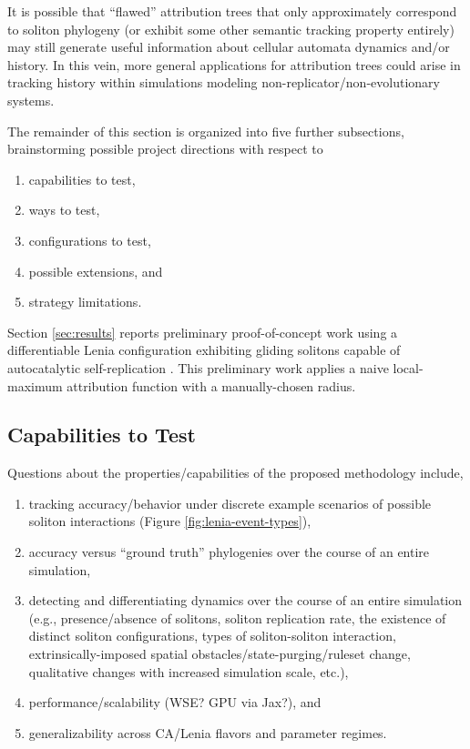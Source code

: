 It is possible that ``flawed'' attribution trees that only approximately correspond to soliton phylogeny (or exhibit some other semantic tracking property entirely) may still generate useful information about cellular automata dynamics and/or history.
In this vein, more general applications for attribution trees could arise in tracking history within simulations modeling non-replicator/non-evolutionary systems.

The remainder of this section is organized into five further subsections, brainstorming possible project directions with respect to
\begin{enumerate}
\item capabilities to test,
\item ways to test,
\item configurations to test,
\item possible extensions, and
\item strategy limitations.
\end{enumerate}

Section \ref{sec:results} reports preliminary proof-of-concept work using a differentiable Lenia configuration exhibiting gliding solitons capable of autocatalytic self-replication \citep{hamon2022learning}.
This preliminary work applies a naive local-maximum attribution function with a manually-chosen radius.

\subsection{Capabilities to Test}

Questions about the properties/capabilities of the proposed methodology include,
\begin{enumerate}
\item tracking accuracy/behavior under discrete example scenarios of possible soliton interactions (Figure \ref{fig:lenia-event-types}),
\item accuracy versus ``ground truth'' phylogenies over the course of an entire simulation,
\item detecting and differentiating dynamics over the course of an entire simulation (e.g., presence/absence of solitons, soliton replication rate, the existence of distinct soliton configurations, types of soliton-soliton interaction, extrinsically-imposed spatial obstacles/state-purging/ruleset change, qualitative changes with increased simulation scale, etc.),
\item performance/scalability (WSE? GPU via Jax?), and
\item generalizability across CA/Lenia flavors and parameter regimes.
\end{enumerate}

